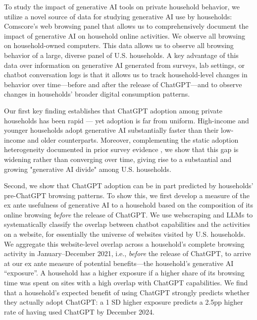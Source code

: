 \documentclass[12pt]{article}
\begin{document}
 
To study the impact of generative AI tools on private household behavior, we  utilize a novel source of data for studying generative AI use by households: Comscore's web browsing panel that allows us to comprehensively document the impact of generative AI on household online activities. We observe all browsing on household-owned computers. This data allows us to observe all browsing behavior of a large, diverse panel of U.S. households. A key advantage of this data over information on generative AI generated from surveys, lab settings, or chatbot conversation logs is that it allows us to track household-level changes in behavior over time---before and after the release of ChatGPT---and to observe changes in households' broader digital consumption patterns.

Our first key finding establishes that ChatGPT adoption among private households has been rapid — yet adoption is far from uniform. High-income and younger households adopt generative AI substantially faster than their low-income and older counterparts. Moreover, complementing the static adoption heterogeneity documented in prior survey evidence \citep{humlum2025}, we show that this gap is widening rather than converging over time, giving rise to a substantial and growing "generative AI divide" among U.S. households.

  
Second, we show that ChatGPT adoption can be in part predicted by households' pre-ChatGPT browsing patterns.  To show this, we first develop a measure of the ex ante usefulness of generative AI to a household based on the composition of its online browsing \textit{before} the release of ChatGPT. We use webscraping and LLMs to systematically classify the overlap between chatbot capabilities and the activities on a website, for essentially the universe of websites visited by U.S. households. We aggregate this website-level overlap across a household's complete browsing activity in January--December 2021, i.e., \textit{before} the release of ChatGPT, to arrive at our ex ante measure of potential benefits---the household's generative AI ``exposure''. A household has a higher exposure if a higher share of its browsing time was spent on sites with a high overlap with ChatGPT capabilities. We find that a household's expected benefit of using ChatGPT strongly predicts whether they actually adopt ChatGPT: a 1 SD higher exposure predicts a 2.5pp higher rate of having used ChatGPT by December 2024.
\end{document}
